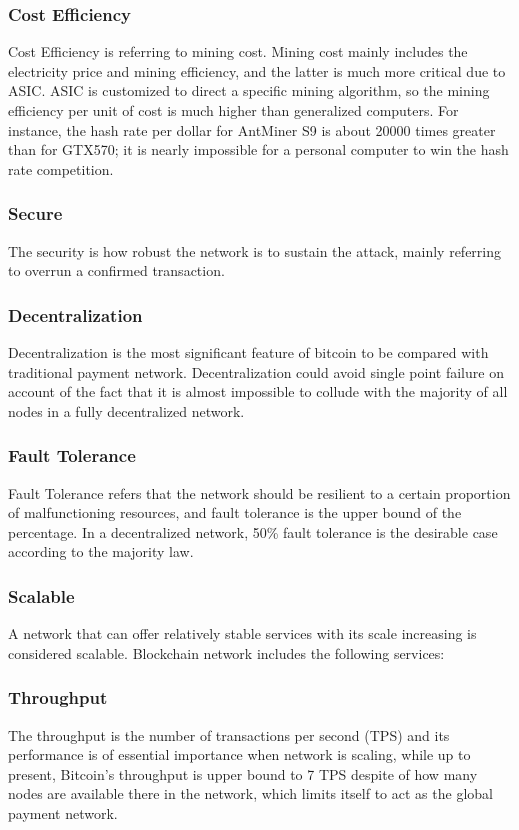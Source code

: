 \documentclass[a4paper,11pt]{article}
\begin{document}
\subsubsection*{Cost Efficiency}
Cost Efficiency is referring to mining cost. Mining cost mainly includes the electricity price and mining efficiency, and the latter is much more critical due to ASIC. ASIC is customized to direct a specific mining algorithm, so the mining efficiency per unit of cost is much higher than generalized computers. For instance, the hash rate per dollar for AntMiner S9 is about 20000 times greater than for GTX570; it is nearly impossible for a personal computer to win the hash rate competition.

\subsubsection{Secure}
The security is how robust the network is to sustain the attack, mainly referring to overrun a confirmed transaction.

\subsubsection*{Decentralization}
Decentralization is the most significant feature of bitcoin to be compared with traditional payment network. Decentralization could avoid single point failure on account of the fact that it is almost impossible to collude with the majority of all nodes in a fully decentralized network.
\subsubsection*{Fault Tolerance}
Fault Tolerance refers that the network should be resilient to a certain proportion of malfunctioning resources, and fault tolerance is the upper bound of the percentage. In a decentralized network, 50\% fault tolerance is the desirable case according to the majority law.

\subsubsection{Scalable}
A network that can offer relatively stable services with its scale increasing is considered scalable. Blockchain network includes the following services:
\subsubsection*{Throughput}
The throughput is the number of transactions per second (TPS) and its performance is of essential importance when network is scaling, while up to present, Bitcoin’s throughput is upper bound to 7 TPS despite of  how many nodes are available there in the network, which limits itself to act as the global payment network.
\end{document}
